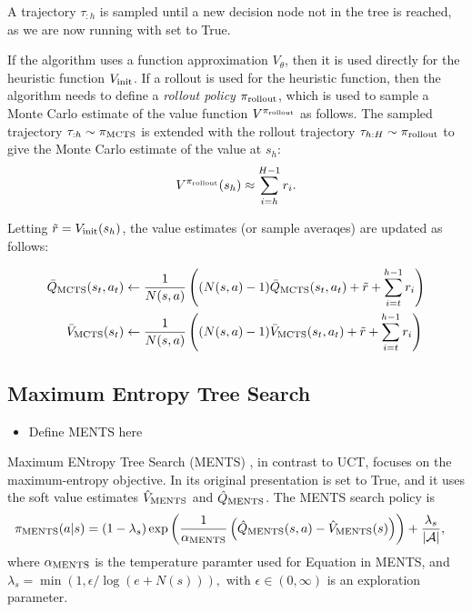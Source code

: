         A trajectory $\tau_{:h}$ is sampled until a new decision node not in the tree is reached, as we are now running with \mctsmode set to True.

        If the algorithm uses a function approximation $V_\theta$, then it is used directly for the heuristic function $V_{\textnormal{init}}$. If a rollout is used for the heuristic function, then the algorithm needs to define a \textit{rollout policy} $\pi_{\textnormal{rollout}}$, which is used to sample a Monte Carlo estimate of the value function $V^{\pi_{\textnormal{rollout}}}$ as follows. The sampled trajectory $\tau_{:h}\sim\pi_{\textnormal{MCTS}}$ is extended with the rollout trajectory $\tau_{h:H}\sim\pi_{\textnormal{rollout}}$ to give the Monte Carlo estimate of the value at $s_h$:
        \begin{align}
            V^{\pi_{\textnormal{rollout}}}(s_h) \approx \sum_{i=h}^{H-1} r_i.
        \end{align}
        
        Letting $\tilde{r} = V_{\textnormal{init}}(s_h)$, the value estimates (or sample averaqes) are updated as follows:

        \begin{align}
            \bar{Q}_{\textnormal{MCTS}}(s_t,a_t) &\leftarrow 
                \frac{1}{N(s,a)} \left( (N(s,a)-1) \bar{Q}_{\textnormal{MCTS}}(s_t,a_t) 
                    + \tilde{r} + \sum_{i=t}^{h-1} r_i \right) \\
            \bar{V}_{\textnormal{MCTS}}(s_t) &\leftarrow 
                \frac{1}{N(s,a)} \left( (N(s,a)-1) \bar{V}_{\textnormal{MCTS}}(s_t,a_t) 
                    + \tilde{r} + \sum_{i=t}^{h-1} r_i \right) 
        \end{align}  

    
    \subsection{Maximum Entropy Tree Search}
    \label{sec:2-2-4-ments}
    
        \begin{itemize}
            \item Define MENTS here
        \end{itemize}



        Maximum ENtropy Tree Search (MENTS) , in contrast to UCT, focuses on the maximum-entropy objective. In its original presentation \mctsmode is set to True, and it uses the soft value estimates $\hat{V}_{\textnormal{MENTS}}$ and $\hat{Q}_{\textnormal{MENTS}}$. The MENTS search policy is
        \begin{align}
            \pi_{\textnormal{MENTS}}(a|s) &= 
                (1-\lambda_s)\exp\left(\frac{1}{\alpha_{\textnormal{MENTS}}}\left(\hat{Q}_{\textnormal{MENTS}}(s,a)-\hat{V}_{\textnormal{MENTS}}(s)\right)\right) 
                    + \frac{\lambda_s}{|\mathcal{A}|},
        \end{align}
        where $\alpha_{\textnormal{MENTS}}$ is the temperature paramter used for Equation  in MENTS, and $\lambda_s=\min(1,\epsilon/\log(e+N(s))),$ with $\epsilon \in (0,\infty)$ is an exploration parameter.

